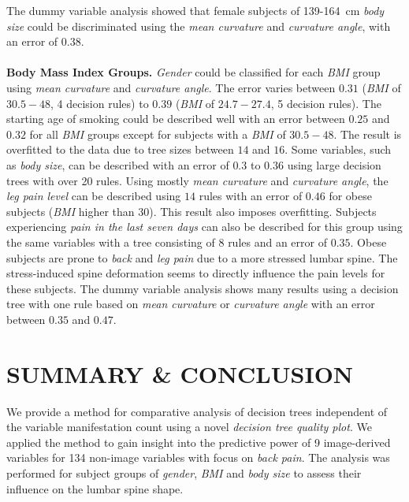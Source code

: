 \documentclass[a4paper,twoside]{style/article}
\begin{document}
The dummy variable analysis showed that female subjects of 139-164~cm \emph{body size} could be discriminated using the \emph{mean curvature} and \emph{curvature angle}, with an error of $0.38$.
\\\\
\noindent \textbf{Body Mass Index Groups.}
\emph{Gender} could be classified for each \emph{BMI} group using \emph{mean curvature} and \emph{curvature angle}.
The error varies between $0.31$ (\emph{BMI} of \emph{$30.5-48$}, 4 decision rules) to $0.39$ (\emph{BMI} of \emph{$24.7-27.4$}, 5 decision rules).
The starting age of smoking could be described well with an error between $0.25$ and $0.32$ for all \emph{BMI} groups except for subjects with a \emph{BMI} of \emph{$30.5-48$}.
The result is overfitted to the data due to tree sizes between $14$ and $16$.
Some variables, such as \emph{body size}, can be described with an error of $0.3$ to $0.36$ using large decision trees with over 20 rules.
Using mostly \emph{mean curvature} and \emph{curvature angle}, the \emph{leg pain level} can be described using $14$ rules with an error of $0.46$ for obese subjects (\emph{BMI} higher than $30$).
This result also imposes overfitting.
Subjects experiencing \emph{pain in the last seven days} can also be described for this group using the same variables with a tree consisting of $8$ rules and an error of $0.35$.
Obese subjects are prone to \emph{back} and \emph{leg pain} due to a more stressed lumbar spine.
The stress-induced spine deformation seems to directly influence the pain levels for these subjects.
The dummy variable analysis shows many results using a decision tree with one rule based on \emph{mean curvature} or \emph{curvature angle} with an error between $0.35$ and $0.47$.
\section{\uppercase{Summary \& Conclusion}}
\label{sec:Conclusion}
\noindent We provide a method for comparative analysis of decision trees independent of the variable manifestation count using a novel \emph{decision tree quality plot}.
We applied the method to gain insight into the predictive power of 9 image-derived variables for 134 non-image variables with focus on \emph{back pain}.
The analysis was performed for subject groups of \emph{gender}, \emph{BMI} and \emph{body size} to assess their influence on the lumbar spine shape.
\end{document}
